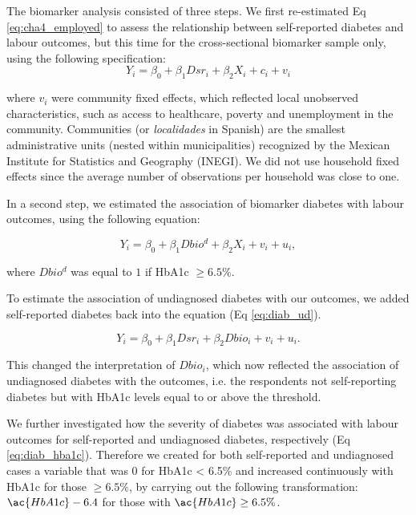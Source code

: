 \documentclass[12pt,english]{article}
\begin{document}
The biomarker analysis consisted of three steps. We first re-estimated Eq \ref{eq:cha4_employed} to assess the relationship between self-reported diabetes and labour outcomes, but this time for the cross-sectional biomarker sample only, using the following specification:
\begin{equation}
Y_{i}=\beta_{0}+\beta_{1}Dsr_{i}+\beta_{2}X_{i}+c_{i}+v_{i}\label{eq:diab_sr}
\end{equation}

where $v_{i}$ were community fixed effects, which reflected local unobserved characteristics, such as access to healthcare, poverty and unemployment in the community. Communities (or \textit{localidades} in Spanish) are the smallest administrative units (nested within municipalities) recognized by the Mexican Institute for Statistics and Geography (INEGI). We did not use household fixed effects since the average number of observations per household was close to one.

In a second step, we estimated the association of biomarker diabetes with labour outcomes, using the following equation:

\begin{equation}
Y_{i}=\beta_{0}+\beta_{1}Dbio^{d}+\beta_{2}X_{i}+v_{i}+u_{i}\label{eq:diab},
\end{equation}

where $Dbio^{d}$ was equal to $1$ if \ac{HbA1c} $\geq 6.5\%$.

To estimate the association of undiagnosed diabetes with our outcomes, we added self-reported diabetes back into the equation (Eq \ref{eq:diab_ud}).

\begin{equation}
Y_{i}=\beta_{0}+\beta_{1}Dsr_{i}+\beta_{2}Dbio_{i}+v_{i}+u_{i}.\label{eq:diab_ud}
\end{equation}

This changed the interpretation of $Dbio_{i}$, which now reflected the association of undiagnosed diabetes with the outcomes, i.e. the respondents not self-reporting diabetes but with \ac{HbA1c} levels equal to or above the threshold. 

We further investigated how the severity of diabetes was associated with labour outcomes for self-reported and undiagnosed diabetes, respectively (Eq \ref{eq:diab_hba1c}). Therefore we created for both self-reported and undiagnosed cases a variable that was $0$ for \ac{HbA1c} < 6.5\% and increased continuously with \ac{HbA1c} for those $\geq 6.5\%$, by carrying out the following transformation: $\ac{HbA1c}-6.4$ for those with $\ac{HbA1c} \geq 6.5\%$.
\end{document}

